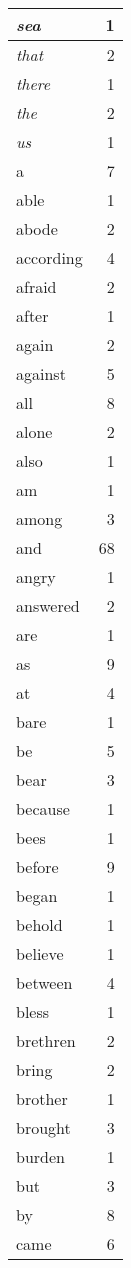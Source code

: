 \begin{center}
\begin{longtable}{l|r}
\emph{sea} & 1 \\ \hline
\emph{that} & 2 \\ \hline
\emph{there} & 1 \\ \hline
\emph{the} & 2 \\ \hline
\emph{us} & 1 \\ \hline
a & 7 \\ \hline
able & 1 \\ \hline
abode & 2 \\ \hline
according & 4 \\ \hline
afraid & 2 \\ \hline
after & 1 \\ \hline
again & 2 \\ \hline
against & 5 \\ \hline
all & 8 \\ \hline
alone & 2 \\ \hline
also & 1 \\ \hline
am & 1 \\ \hline
among & 3 \\ \hline
and & 68 \\ \hline
angry & 1 \\ \hline
answered & 2 \\ \hline
are & 1 \\ \hline
as & 9 \\ \hline
at & 4 \\ \hline
bare & 1 \\ \hline
be & 5 \\ \hline
bear & 3 \\ \hline
because & 1 \\ \hline
bees & 1 \\ \hline
before & 9 \\ \hline
began & 1 \\ \hline
behold & 1 \\ \hline
believe & 1 \\ \hline
between & 4 \\ \hline
bless & 1 \\ \hline
brethren & 2 \\ \hline
bring & 2 \\ \hline
brother & 1 \\ \hline
brought & 3 \\ \hline
burden & 1 \\ \hline
but & 3 \\ \hline
by & 8 \\ \hline
came & 6 \\ \hline

\end{longtable}
\end{center}
